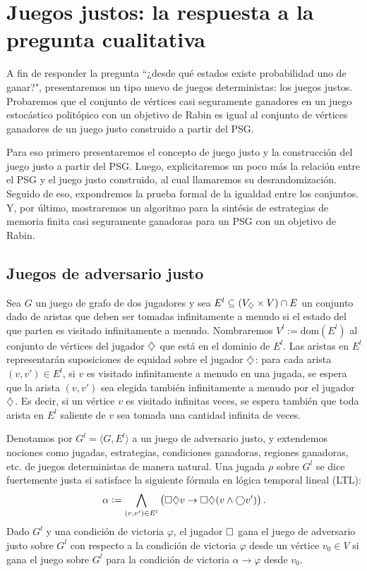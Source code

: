 \section{Juegos justos: la respuesta a la pregunta cualitativa}
\label{sec:prueba}

A fin de responder la pregunta ``¿desde qué estados existe probabilidad uno de
ganar?", presentaremos un tipo nuevo de juegos deterministas: los juegos
justos. Probaremos que el conjunto de vértices casi seguramente ganadores en un
juego estocástico politópico con un objetivo de Rabin es igual al conjunto de
vértices ganadores de un juego justo construido a partir del PSG.

Para eso primero presentaremos el concepto de juego justo y la construcción del
juego justo a partir del PSG. Luego, explicitaremos un poco más la relación
entre el PSG y el juego justo construido, al cual llamaremos su
desrandomización. Seguido de eso, expondremos la prueba formal de la igualdad
entre los conjuntos. Y, por último, mostraremos un algoritmo para la sintésis
de estrategias de memoria finita casi seguramente ganadoras para un PSG con un
objetivo de Rabin.

\subsection{Juegos de adversario justo}

Sea $G$ un juego de grafo de dos jugadores y sea $E^{l} \subseteq (V_\diamondsuit
	\times V) \cap E$ un conjunto dado de aristas que deben ser tomadas
infinitamente a menudo si el estado del que parten es visitado infinitamente a
menudo. Nombraremos $V^{l} := \mathrm{dom}(E^{l})$ al conjunto de vértices del
jugador $\diamondsuit$ que está en el dominio de $E^{l}$. Las aristas en $E^{l}$
representarán suposiciones de equidad sobre el jugador $\diamondsuit$: para cada
arista $(v, v') \in E^{l}$, si $v$ es visitado infinitamente a menudo en una
jugada, se espera que la arista $(v, v')$ sea elegida también infinitamente a
menudo por el jugador $\diamondsuit$. Es decir, si un vértice $v$ es visitado
infinitas veces, se espera también que toda arista en $E^l$ saliente de $v$ sea
tomada una cantidad infinita de veces.

Denotamos por $G^{l} = \langle G, E^{l} \rangle$ a un juego de adversario
justo, y extendemos nociones como jugadas, estrategias, condiciones ganadoras,
regiones ganadoras, etc. de juegos deterministas de manera natural. Una jugada
$\rho$ sobre $G^{l}$ se dice fuertemente justa si satisface la siguiente
fórmula en lógica temporal lineal (LTL):
\[
	\alpha := \bigwedge_{(v, v') \in E^{l}} \left( \square \diamondsuit v \rightarrow \square \diamondsuit (v \wedge \bigcirc v') \right).
\]
Dado $G^{l}$ y una condición de victoria $\varphi$, el jugador $\square$ gana el
juego de adversario justo sobre $G^{l}$ con respecto a la condición de victoria
$\varphi$ desde un vértice $v_0 \in V$ si gana el juego sobre $G^{l}$ para la
condición de victoria $\alpha \rightarrow \varphi$ desde $v_0$.

